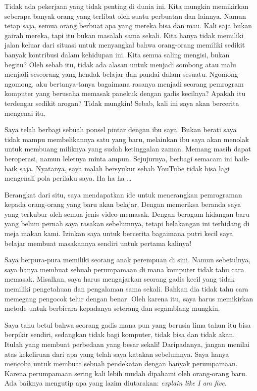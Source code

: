 \documentclass[smalldemyvopaper,11pt,twoside,onecolumn,openright,extrafontsizes]{memoir}
\begin{document}
Tidak ada pekerjaan yang tidak penting di dunia ini. Kita mungkin memikirkan seberapa banyak orang yang terlibat oleh suatu perbuatan dan lainnya. Namun tetap saja, semua orang berbuat apa yang mereka bisa dan mau. Kali saja bukan gairah mereka, tapi itu bukan masalah sama sekali. Kita hanya tidak memiliki jalan keluar dari situasi untuk menyangkal bahwa orang-orang memiliki sedikit banyak kontribusi dalam kehidupan ini. Kita semua saling mengisi, bukan begitu? Oleh sebab itu, tidak ada alasan untuk menjadi sombong atau malu menjadi seseorang yang hendak belajar dan pandai dalam sesuatu. Ngomong-ngomong, aku bertanya-tanya bagaimana rasanya menjadi seorang pemrogram komputer yang berusaha memasak panekuk dengan gadis kecilnya? Apakah itu terdengar sedikit arogan? Tidak mungkin! Sebab, kali ini saya akan bercerita mengenai itu.

Saya telah berbagi sebuah ponsel pintar dengan ibu saya. Bukan berati saya tidak mampu membelikannya satu yang baru, melainkan ibu saya akan menolak untuk membuang miliknya yang sudah ketinggalan zaman. Memang masih dapat beroperasi, namun leletnya minta ampun. Sejujurnya, berbagi semacam ini baik-baik saja. Nyatanya, saya malah bersyukur sebab YouTube tidak bisa lagi mengenali pola perilaku saya. Ha ha ha \dots


Berangkat dari situ, saya mendapatkan ide untuk menerangkan pemrograman kepada orang-orang yang baru akan belajar. Dengan memeriksa beranda saya yang terkubur oleh semua jenis video memasak. Dengan beragam hidangan baru yang belum pernah saya rasakan sebelumnya, tetapi belakangan ini terhidang di meja makan kami. Izinkan saya untuk bercerita bagaimana putri kecil saya belajar membuat masakannya sendiri untuk pertama kalinya!

Saya berpura-pura memiliki seorang anak perempuan di sini. Namun sebetulnya, saya hanya membuat sebuah perumpamaan di mana komputer tidak tahu cara memasak. Misalkan, saya harus mengajarkan seorang gadis kecil yang tidak memiliki pengetahuan dan pengalaman sama sekali. Bahkan dia tidak tahu cara memegang pengocok telur dengan benar. Oleh karena itu, saya harus memikirkan metode untuk berbicara kepadanya seterang dan segamblang mungkin.

Saya tahu betul bahwa seorang gadis mana pun yang berusia lima tahun itu bisa berpikir sendiri, sedangkan tidak bagi komputer, tidak bisa dan tidak akan. Itulah yang membuat perbedaan yang besar sekali! Daripadanya, jangan menilai atas kekeliruan dari apa yang telah saya katakan sebelumnya. Saya hanya mencoba untuk membuat sebuah pendekatan dengan banyak perumpamaan. Karena perumpamaan sering kali lebih mudah dipahami oleh orang-orang baru. Ada baiknya mengutip apa yang lazim diutarakan: \textit{explain like I am five}.
\end{document}
